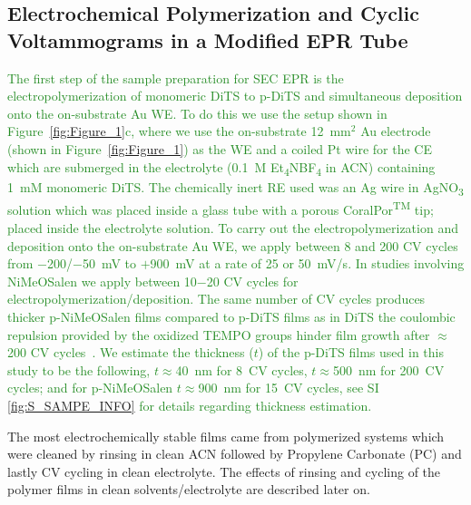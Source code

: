 \documentclass{WileyMSP-template}
\newcommand{\np}[1]{\textcolor{ForestGreen}{#1}}
\newcommand{\ik}[1]{\textcolor{RawSienna}{#1}}
\begin{document}
\bigbreak

\subsection*{Electrochemical Polymerization and Cyclic Voltammograms in a Modified EPR Tube}\label{CVTube}

\np{
The first step of the sample preparation for SEC EPR is the electropolymerization of monomeric DiTS to p-DiTS and simultaneous deposition onto the on-substrate Au WE. To do this we use the setup shown in Figure~\ref{fig:Figure_1}c, where we use the on-substrate 12~mm$^2$ Au electrode (shown in Figure~\ref{fig:Figure_1}) as the WE and a coiled Pt wire for the CE which are submerged in the electrolyte (0.1~M Et\textsubscript{4}NBF\textsubscript{4} in ACN) containing 1~mM monomeric DiTS. The chemically inert RE used was an Ag wire in AgNO\textsubscript{3} solution which was placed inside a glass tube with a porous CoralPor\textsuperscript{TM} tip; placed inside the electrolyte solution. To carry out the electropolymerization and deposition onto the on-substrate Au WE, we apply between 8 and 200 CV cycles from $-$200/$-$50~mV to $+$900~mV at a rate of 25 or 50~mV/s. In studies involving NiMeOSalen we apply between 10$-$20 CV cycles for electropolymerization/deposition. The same number of CV cycles produces thicker p-NiMeOSalen films compared to p-DiTS films as in DiTS the coulombic repulsion provided by the oxidized TEMPO groups hinder film growth after $\approx$200 CV cycles~\cite{vereshchagin2020_battandsupercaps}. We estimate the thickness ($t$) of the p-DiTS films used in this study to be the following, $t\approx$40~nm for 8~CV cycles, $t\approx$500~nm for 200~CV cycles; and for p-NiMeOSalen $t\approx$900~nm for 15~CV cycles, see SI \ref{fig:S_SAMPE_INFO} for details regarding thickness estimation.
}

\bigbreak

The most electrochemically stable films came from polymerized systems which were cleaned by rinsing in clean ACN followed by Propylene Carbonate (PC) and lastly CV cycling in clean electrolyte. The effects of rinsing and cycling of the polymer films in clean solvents/electrolyte are described later on.

\bigbreak

\end{document}
